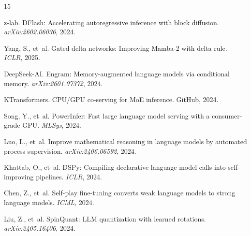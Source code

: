 \documentclass[10pt,a4paper]{article}
\begin{document}
\begin{thebibliography}{15}

z-lab. DFlash: Accelerating autoregressive inference with block diffusion. \emph{arXiv:2602.06036}, 2024.

Yang, S., et~al. Gated delta networks: Improving Mamba-2 with delta rule. \emph{ICLR}, 2025.

DeepSeek-AI. Engram: Memory-augmented language models via conditional memory. \emph{arXiv:2601.07372}, 2024.

KTransformers. CPU/GPU co-serving for MoE inference. GitHub, 2024.

Song, Y., et~al. PowerInfer: Fast large language model serving with a consumer-grade GPU. \emph{MLSys}, 2024.

Luo, L., et~al. Improve mathematical reasoning in language models by automated process supervision. \emph{arXiv:2406.06592}, 2024.

Khattab, O., et~al. DSPy: Compiling declarative language model calls into self-improving pipelines. \emph{ICLR}, 2024.

Chen, Z., et~al. Self-play fine-tuning converts weak language models to strong language models. \emph{ICML}, 2024.

Liu, Z., et~al. SpinQuant: LLM quantization with learned rotations. \emph{arXiv:2405.16406}, 2024.

\end{thebibliography}
\end{document}
